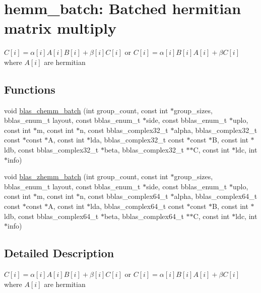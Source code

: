 \hypertarget{group__hemm__batch}{}\section{hemm\+\_\+batch\+: Batched hermitian matrix multiply}
\label{group__hemm__batch}


$ C[i] = \alpha[i] A[i] B[i] + \beta[i] C[i] $ or $ C[i] = \alpha[i] B[i] A[i] + \beta C[i] $ where $ A[i] $ are hermitian  


\subsection*{Functions}
\begin{DoxyCompactItemize}
\item 
void \mbox{\hyperlink{group__hemm__batch_gac708e40d6650c0de054693950359c1e6}{blas\+\_\+chemm\+\_\+batch}} (int group\+\_\+count, const int $\ast$group\+\_\+sizes, bblas\+\_\+enum\+\_\+t layout, const bblas\+\_\+enum\+\_\+t $\ast$side, const bblas\+\_\+enum\+\_\+t $\ast$uplo, const int $\ast$m, const int $\ast$n, const bblas\+\_\+complex32\+\_\+t $\ast$alpha, bblas\+\_\+complex32\+\_\+t const $\ast$const $\ast$A, const int $\ast$lda, bblas\+\_\+complex32\+\_\+t const $\ast$const $\ast$B, const int $\ast$ldb, const bblas\+\_\+complex32\+\_\+t $\ast$beta, bblas\+\_\+complex32\+\_\+t $\ast$$\ast$C, const int $\ast$ldc, int $\ast$info)
\item 
void \mbox{\hyperlink{group__hemm__batch_gac72a9c3caf452b2ecded5f55399035f9}{blas\+\_\+zhemm\+\_\+batch}} (int group\+\_\+count, const int $\ast$group\+\_\+sizes, bblas\+\_\+enum\+\_\+t layout, const bblas\+\_\+enum\+\_\+t $\ast$side, const bblas\+\_\+enum\+\_\+t $\ast$uplo, const int $\ast$m, const int $\ast$n, const bblas\+\_\+complex64\+\_\+t $\ast$alpha, bblas\+\_\+complex64\+\_\+t const $\ast$const $\ast$A, const int $\ast$lda, bblas\+\_\+complex64\+\_\+t const $\ast$const $\ast$B, const int $\ast$ldb, const bblas\+\_\+complex64\+\_\+t $\ast$beta, bblas\+\_\+complex64\+\_\+t $\ast$$\ast$C, const int $\ast$ldc, int $\ast$info)
\end{DoxyCompactItemize}


\subsection{Detailed Description}
$ C[i] = \alpha[i] A[i] B[i] + \beta[i] C[i] $ or $ C[i] = \alpha[i] B[i] A[i] + \beta C[i] $ where $ A[i] $ are hermitian 



